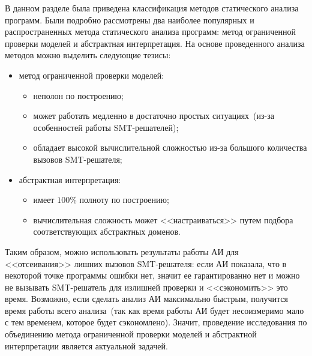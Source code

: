 В данном разделе была приведена классификация методов статического анализа 
программ. Были подробно рассмотрены два наиболее популярных и распространенных
метода статического анализа программ: метод ограниченной проверки моделей и
абстрактная интерпретация. На основе проведенного анализа методов можно 
выделить следующие тезисы:
\begin{itemize}
\item метод ограниченной проверки моделей:
	\begin{itemize}
	\item неполон по построению;
	\item может работать медленно в достаточно простых ситуациях~(из-за 
	особенностей работы SMT-решателей);
	\item обладает высокой вычислительной сложностью из-за большого количества
	вызовов SMT-решателя;
	\end{itemize}
\item абстрактная интерпретация:
	\begin{itemize}
	\item имеет $100\%$ полноту по построению;
	\item вычислительная сложность может <<настраиваться>> путем подбора
	соответствующих абстрактных доменов.
	\end{itemize}
\end{itemize}


Таким образом, можно использовать результаты работы АИ для <<отсеивания>> 
лишних вызовов SMT-решателя: если АИ показала, что в некоторой точке программы 
ошибки нет, значит ее гарантированно нет и можно не вызывать SMT-решатель для 
излишней проверки и <<сэкономить>> это время. Возможно, если сделать анализ АИ 
максимально быстрым, получится время работы всего анализа~(так как время 
работы АИ будет несоизмеримо мало с тем временем, которое будет сэкономлено).
Значит, проведение исследования по объединению метода ограниченной проверки
моделей и абстрактной интерпретации является актуальной задачей.